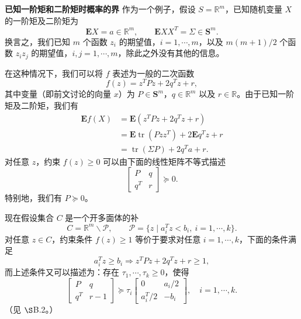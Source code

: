 \documentclass[UTF8, 12pt, fontset=fandol, oneside]{ctexart}
\begin{document}
\noindent\textbf{已知一阶矩和二阶矩时概率的界}\quad
作为一个例子，假设 $S=\mathbb{R}^m$，已知随机变量 $X$ 的一阶矩及二阶矩为
\[
\mathbf{E}X=a\in\mathbb{R}^m,\qquad
\mathbf{E}XX^T=\Sigma\in\mathbf{S}^m.
\]
换言之，我们已知 $m$ 个函数 $z_i$ 的期望值，$i=1,\cdots,m$，以及 $m(m+1)/2$ 个函数 $z_iz_j$ 的期望值，$i,j=1,\cdots,m$，除此之外没有其他的信息。

在这种情况下，我们可以将 $f$ 表述为一般的二次函数
\[
f(z)=z^TPz+2q^Tz+r,
\]
其中变量（即前文讨论的向量 $x$）为 $P\in\mathbf{S}^m$，$q\in\mathbb{R}^m$ 以及 $r\in\mathbb{R}$。由于已知一阶矩及二阶矩，我们有
\[
\begin{aligned}
\mathbf{E}f(X)&=\mathbf{E}(z^TPz+2q^Tz+r)\\
&=\mathbf{E}\operatorname{tr}(Pzz^T)+2\mathbf{E}q^Tz+r\\
&=\operatorname{tr}(\Sigma P)+2q^Ta+r.
\end{aligned}
\]
对任意 $z$，约束 $f(z)\geq 0$ 可以由下面的线性矩阵不等式描述
\[
\begin{bmatrix}
P & q\\
q^T & r
\end{bmatrix}\succeq 0.
\]
特别地，我们有 $P\succeq 0$。

现在假设集合 $C$ 是一个开多面体的补
\[
C=\mathbb{R}^m\backslash\mathcal{P},\qquad
\mathcal{P}=\{z\mid a_i^Tz<b_i,\ i=1,\cdots,k\}.
\]
对任意 $z\in C$，约束条件 $f(z)\geq 1$ 等价于要求对任意 $i=1,\cdots,k$，下面的条件满足
\[
a_i^Tz\geq b_i\Longrightarrow z^TPz+2q^Tz+r\geq 1,
\]
而上述条件又可以描述为：存在 $\tau_1,\cdots,\tau_k\geq 0$，使得
\[
\begin{bmatrix}
P & q\\
q^T & r-1
\end{bmatrix}\succeq
\tau_i
\begin{bmatrix}
0 & a_i/2\\
a_i^T/2 & -b_i
\end{bmatrix},
\quad i=1,\cdots,k.
\]
（见 $\S$B.2。）
\end{document}
